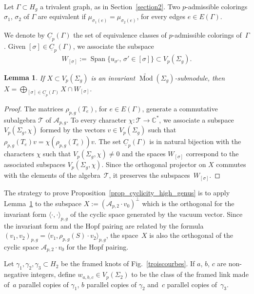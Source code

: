 \documentclass[11pt]{article}
\newcommand{\Span}{\operatorname{Span}}
\newcommand{\colu}{\underline{C}_p(\Gamma) }
\newcommand{\Mod}{\operatorname{Mod}}
\newcommand{\emcg}{\widetilde{\Mod}(\Sigma_g)}
\numberwithin{equation}{section}
\newtheorem{Lemma}[Theorem]{Lemma}
\begin{document}
Let $\Gamma\subset H_g$ a trivalent graph, as in Section~\ref{section2}. Two $p$-admissible colorings $\sigma_1$, $\sigma_2$ of $\Gamma$ are equivalent if $\mu_{\sigma_1(e)}=\mu_{\sigma_2(e)}$, for every edges $e \in E(\Gamma)$.

We denote by $\colu$ the set of equivalence classes of $p$-admissible colorings of~$\Gamma$. Given $[\sigma]\in \colu$, we associate the subspace
\begin{gather*} W_{[\sigma]} := \Span \{ u_{\sigma'},\, \sigma'\in [\sigma] \} \subset V_p(\Sigma_g). \end{gather*}

\begin{Lemma}\label{lemma1}If $X\subset V_p(\Sigma_g)$ is an invariant $\emcg$-submodule, then $ X=\bigoplus_{[\sigma]\in \colu} X\cap W_{[\sigma]}$.
\end{Lemma}

\begin{proof} The matrices $\rho_{p,g}(T_e)$, for $e\in E(\Gamma)$, generate a commutative subalgebra $\mathcal{T}$ of $\mathcal{A}_{p,g}$. To every character $\chi \colon \mathcal{T}\rightarrow \mathbb{C}^*$, we associate a subspace $V_p(\Sigma_g, \chi)$ formed by the vectors $v\in V_p(\Sigma_g)$ such that $\rho_{p,g}(T_e)v=\chi(\rho_{p,g}(T_e))v$. The set $\colu$ is in natural bijection with the characters $\chi$ such that $V_p(\Sigma_g,\chi)\neq 0$ and the spaces $W_{[\sigma]}$ correspond to the associated subspaces $V_p(\Sigma_g, \chi)$. Since the orthogonal projector on $X$ commutes with the elements of the algebra~$\mathcal{T}$, it preserves the subspaces~$W_{[\sigma]}$.
\end{proof}

The strategy to prove Proposition~\ref{prop_cyclicity_high_genus} is to apply Lemma~\ref{lemma1} to the subspace $ X:= ( \mathcal{A}_{p,2}\cdot v_0 ) ^{\bot}$ which is the orthogonal for the invariant form $\langle \cdot, \cdot \rangle_{p,g}$ of the cyclic space generated by the vacuum vector. Since the invariant form and the Hopf pairing are related by the formula $(v_1, v_2)_{p,g}=\langle v_1, \rho_{p,g}(S)\cdot v_2\rangle_{p,g}$, the space~$X$ is also the orthogonal of the cyclic space $\mathcal{A}_{p,2}\cdot v_0$ for the Hopf pairing.

Let $\gamma_1, \gamma_2, \gamma_3 \subset H_2$ be the framed knots of Fig.~\ref{troiscourbes}. If $a$, $b$, $c$ are non-negative integers, define $w_{a,b,c}\in V_p(\Sigma_2)$ to be the class of the framed link made of~$a$ parallel copies of $\gamma_1$, $b$ parallel copies of $\gamma_2$ and~$c$ parallel copies of~$\gamma_3$.
\end{document}

